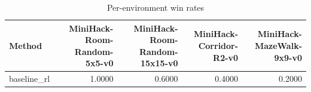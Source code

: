 \begin{table}[htbp]
\centering
\caption{Per-environment win rates}
\label{tab:per-env}
\begin{tabular}{lrrrr}
\toprule
\textbf{Method} & \textbf{MiniHack-Room-Random-5x5-v0} & \textbf{MiniHack-Room-Random-15x15-v0} & \textbf{MiniHack-Corridor-R2-v0} & \textbf{MiniHack-MazeWalk-9x9-v0} \\
\midrule
baseline\_rl & 1.0000 & 0.6000 & 0.4000 & 0.2000 \\
\bottomrule
\end{tabular}
\end{table}